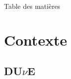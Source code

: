 




  {
  \begin{frame}\titlepage \vspace{-0.5cm}\end{frame}

  \begin{frame}{Table des matières}\tableofcontents\end{frame}}
  \setcounter{framenumber}{0}

  \section{Contexte}
    \subsection{DU$\nu$E}

